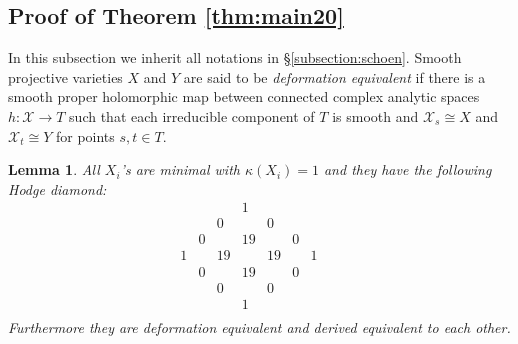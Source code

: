 \documentclass[a4paper,11pt]{article}
\newtheorem{lem}[thm]{Lemma}
\theoremstyle{definition}\newtheorem{defn}[thm]{Definition}
\theoremstyle{remark}\newtheorem{remark}[thm]{Remark}
\numberwithin{equation}{section}
\newcommand{\mc}{\mathcal}
\begin{document}
\subsection{Proof of Theorem \ref{thm:main20}}\label{subsection:main2}
In this subsection
we inherit all notations in \S \ref{subsection:schoen}.
Smooth projective varieties $X$ and $Y$ are said to be 
\emph{deformation equivalent} 
if there is a smooth proper holomorphic map between connected 
complex analytic spaces
$h \colon \mc X\to T$ such that each irreducible 
component of $T$ is smooth and
$\mc X_s\cong X$ and  $\mc X_t\cong Y$ for points $s,t\in T$.  


\begin{lem}\label{lem:invariant}
All $X_i$'s are minimal with 
$\kappa (X_i)=1$ and 
they have the following Hodge diamond:
$$
\begin{array}{ccccccccc}
 &  &  & 1&  &  &  &  & \\
 &  & 0&  & 0&  &  &  & \\
 & 0&  &19&  & 0&  &  & \\
1&  &19&  &19&  & 1&  & \\
 & 0&  &19&  & 0&  &  & \\
 &  & 0&  & 0&  &  &  & \\
 &  &  & 1&  &  &  &  & \\ 
\end{array}
$$
Furthermore they are deformation equivalent and derived equivalent to
each other.
\end{lem}
\end{document}
